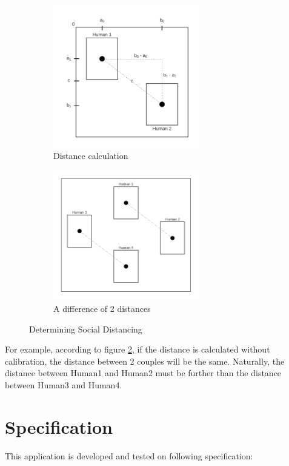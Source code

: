         \begin{figure}[h!]
            \centering
            \begin{subfigure}{.5\textwidth}
              \centering
              \includegraphics[width=2.5in]{images/chapter2/distance.png}
              \caption{Distance calculation}
              \label{distanceCalculation}
            \end{subfigure}%
            \begin{subfigure}{.5\textwidth}
              \centering
              \includegraphics[width=2.5in]{images/chapter2/two-distances.png}
              \caption{A difference of 2 distances}
              \label{twoDistances}
            \end{subfigure}
            \caption{Determining Social Distancing}
            \label{determiningConcept}
        \end{figure}

        For example, according to figure \ref{twoDistances},
        if the distance is calculated without calibration, the distance between 2 couples will be the same.
        Naturally, the distance between Human1 and Human2 must be further than the distance between Human3 and Human4.

    \section{Specification}
        This application is developed and tested on following specification:

